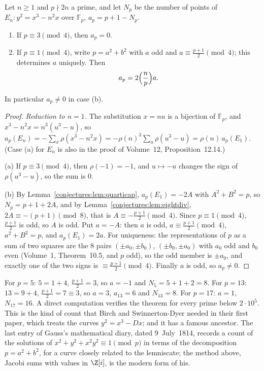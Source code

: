 \begin{theorem}\label{conjectures:thm:countEn}
Let $n\ge1$ and $p\nmid2n$ a prime, and let $N_p$ be the number of points of $E_n:y^2=x^3-n^2x$ over $\mathbb F_p$, $a_p=p+1-N_p$.
\begin{enumerate}[label=(\alph*)]
\item If $p\equiv3\pmod4$, then $a_p=0$.
\item If $p\equiv1\pmod4$, write $p=a^2+b^2$ with $a$ odd and $a\equiv\frac{p+1}2\pmod4$; this determines $a$ uniquely. Then
\[
a_p=2\Bigl(\frac np\Bigr)a.
\]
\end{enumerate}
In particular $a_p\ne0$ in case (b).
\end{theorem}
\begin{proof}
\emph{Reduction to $n=1$.} The substitution $x=nu$ is a bijection of $\mathbb F_p$, and $x^3-n^2x=n^3(u^3-u)$, so
$a_p(E_n)=-\sum_x\rho(x^3-n^2x)=-\rho(n)^3\sum_u\rho(u^3-u)=\rho(n)\,a_p(E_1)$. (Case (a) for $E_n$ is also in the proof of Volume~12, Proposition~12.14.)

(a) If $p\equiv3\pmod4$, then $\rho(-1)=-1$, and $u\mapsto-u$ changes the sign of $\rho(u^3-u)$, so the sum is $0$.

(b) By Lemma~\ref{conjectures:lem:quarticap}, $a_p(E_1)=-2A$ with $A^2+B^2=p$, so $N_p=p+1+2A$, and by Lemma~\ref{conjectures:lem:eightdiv}, $2A\equiv-(p+1)\pmod8$, that is
$A\equiv-\frac{p+1}2\pmod4$. Since $p\equiv1\pmod4$, $\frac{p+1}2$ is odd, so $A$ is odd. Put $a=-A$: then $a$ is odd, $a\equiv\frac{p+1}2\pmod4$, $a^2+B^2=p$,
and $a_p(E_1)=2a$. For uniqueness: the representations of $p$ as a sum of two squares are the $8$ pairs $(\pm a_0,\pm b_0)$, $(\pm b_0,\pm a_0)$ with $a_0$ odd
and $b_0$ even (Volume~1, Theorem~10.5, and $p$ odd), so the odd member is $\pm a_0$, and exactly one of the two signs is $\equiv\frac{p+1}2\pmod4$. Finally
$a$ is odd, so $a_p\ne0$.
\end{proof}

For $p=5$: $5=1+4$, $\frac{p+1}2=3$, so $a=-1$ and $N_5=5+1+2=8$. For $p=13$: $13=9+4$, $\frac{p+1}2=7\equiv3$, so $a=3$, $a_{13}=6$ and $N_{13}=8$. For
$p=17$: $a=1$, $N_{17}=16$. A direct computation verifies the theorem for every prime below $2\cdot10^5$. This is the kind of count that Birch and Swinnerton-Dyer
needed in their first paper, which treats the curves $y^2=x^3-Dx$; and it has a famous ancestor. The last entry of Gauss's mathematical diary, dated
9~July~1814, records a count of the solutions of $x^2+y^2+x^2y^2\equiv1\pmod p$ in terms of the decomposition $p=a^2+b^2$, for a curve closely related
to the lemniscate; the method above, Jacobi sums with values in $\Z[i]$, is the modern form of his.

